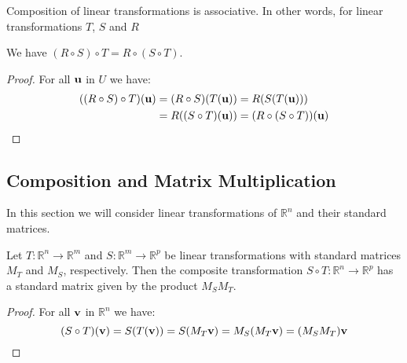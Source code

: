 \documentclass{ximera}
\renewcommand{\vec}[1]{{\bf #1}}
\newcommand{\RR}{\mathbb{R}}
\begin{document}
\begin{theorem}Composition of linear transformations is associative.  In other words, for linear transformations  $T$, $S$ and $R$

\begin{center}
\end{center}
We have $(R\circ S)\circ T=R\circ (S\circ T)$.
\end{theorem}
\begin{proof} For all $\vec{u}$ in $U$ we have:
\begin{align*}
((R\circ S)\circ T)(\vec{u})&=(R\circ S)(T(\vec{u}))=R(S(T(\vec{u})))\\
&=R((S\circ T)(\vec{u}))=(R\circ (S\circ T))(\vec{u})
\end{align*}
\end{proof}

\subsection*{Composition and Matrix Multiplication}

In this section we will consider linear transformations of $\RR^n$ and their standard matrices.  

\begin{theorem}
Let $T:\RR^n\rightarrow \RR^m$ and $S:\RR^m\rightarrow \RR^p$ be linear transformations with standard matrices $M_T$ and $M_S$, respectively.  Then the composite transformation $S\circ T:\RR^n\rightarrow \RR^p$ has a standard matrix given by the product $M_SM_T$.
\end{theorem}
\begin{proof}
For all $\vec{v}$ in $\RR^n$ we have:
$$(S\circ T)(\vec{v})=S(T(\vec{v}))=S(M_T\vec{v})=M_S(M_T\vec{v})=(M_SM_T)\vec{v}$$
\end{proof}
\end{document}
